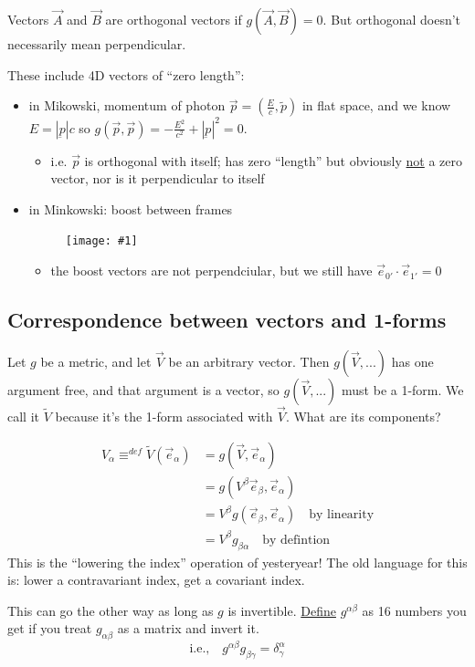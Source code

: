 \documentclass[a4paper]{article} %
\newcommand{\utilde}[1]{\tilde{#1}}
\newcommand{\picturesize}[2]
{
\begin{figure}[h]
\centering
\texttt{[image: \#1]}
\end{figure}
}
\renewcommand{\tilde}{\widetilde}
\begin{document}
Vectors $\vec{A}$ and $\vec{B}$ are orthogonal vectors if $g(\vec{A},\vec{B})=0$. But orthogonal doesn't necessarily mean perpendicular.

These include 4D vectors of ``zero length'':
\begin{itemize}
\item in Mikowski, momentum of photon $\vec{p}=\left(\frac{E}{c},\utilde{p}\right)$ in flat space,
and we know $E=|\underbar{p}|c$ so $g(\vec{p},\vec{p})=-\frac{E^2}{c^2}+|\underbar{p}|^2=0$.
\begin{itemize}
\item i.e. $\vec{p}$ is orthogonal with itself; has zero ``length'' but obviously \underline{not} a zero vector, nor is it perpendicular to itself
\end{itemize}
\item in Minkowski: boost between frames
\picturesize{images/minkowski_boost.png}{0.4}
\begin{itemize}
\item the boost vectors are not perpendciular, but we still have $\vec{e}_{0'}\cdot\vec{e}_{1'}=0$
\end{itemize}
\end{itemize}


\subsection{Correspondence between vectors and 1-forms}

Let $g$ be a metric, and let $\vec{V}$ be an arbitrary vector. Then $g(\vec{V},...)$ has one argument free, and that argument is a vector, so $g(\vec{V},...)$ must be a 1-form. We call it $\tilde{V}$ because it's the 1-form associated with $\vec{V}$. What are its components?

\begin{align*}
V_{\alpha}\equiv^{def}\tilde{V}(\vec{e}_{\alpha})&=g(\vec{V},\vec{e}_{\alpha})\\
&=g(V^{\beta}\vec{e}_{\beta},\vec{e}_{\alpha})\\
&=V^{\beta}g(\vec{e}_{\beta},\vec{e}_{\alpha})\quad\text{by linearity}\\
&=V^{\beta}g_{\beta\alpha}\quad\text{by defintion}
\end{align*}
This is the ``lowering the index'' operation of yesteryear! The old language for this is: lower a contravariant index, get a covariant index.

This can go the other way as long as $g$ is invertible. \underline{Define} $g^{\alpha\beta}$ as 16 numbers you get if you treat $g_{\alpha\beta}$ as a matrix and invert it.
\begin{equation}
\text{i.e.,}\quad g^{\alpha\beta}g_{\beta\gamma}=\delta^{\alpha}_{\gamma}
\end{equation}
\end{document}
